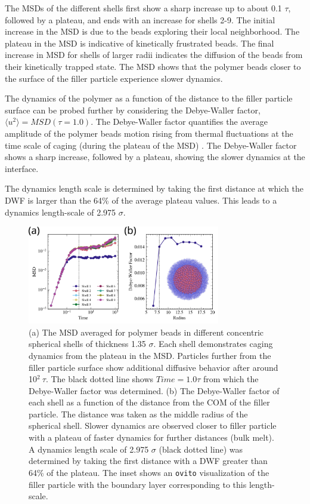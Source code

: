 \documentclass[10pt,a4paper]{labreport}
\begin{document}
The MSDs of the different shells first show a sharp increase up to about 0.1 $\tau$, followed by a plateau, and ends with an increase for shells 2-9.
The initial increase in the MSD is due to the beads exploring their local neighborhood.
The plateau in the MSD is indicative of kinetically frustrated beads.
The final increase in MSD for shells of larger radii indicates the diffusion of the beads from their kinetically trapped state.  
The MSD shows that the polymer beads closer to the surface of the filler particle experience slower dynamics.  

The dynamics of the polymer as a function of the distance to the filler particle surface can be probed further by considering the Debye-Waller factor, $\langle u^2 \rangle = MSD(\tau = 1.0)$. 
The Debye-Waller factor quantifies the average amplitude of the polymer beads motion rising from thermal fluctuations at the time scale of caging (during the plateau of the MSD) \cite{zhuEffectNanoparticleSoftness2022a}.  
The Debye-Waller factor shows a sharp increase, followed by a plateau, showing the slower dynamics at the interface.

The dynamics length scale is determined by taking the first distance at which the DWF is larger than the 64\% of the average plateau values. 
This leads to a dynamics length-scale of 2.975 $\sigma$.  

\begin{figure}[h]
  \centering
  \includegraphics[width = 0.75\textwidth]{figs/ass3_dynamics.png}
  \caption{(a) The MSD averaged for polymer beads in different concentric spherical shells of thickness 1.35 $\sigma$. Each shell demonstrates caging dynamics from the plateau in the MSD. Particles further from the filler particle surface show additional diffusive behavior after around 10$^2~\tau$. The black dotted line shows $Time = 1.0 \tau$ from which the Debye-Waller factor was determined. (b) The Debye-Waller factor of each shell as a function of the distance from the COM of the filler particle. The distance was taken as the middle radius of the spherical shell. Slower dynamics are observed closer to filler particle with a plateau of faster dynamics for further distances (bulk melt). A dynamics length scale of 2.975 $\sigma$ (black dotted line) was determined by taking the first distance with a DWF greater than 64\% of the plateau. The inset shows an \texttt{ovito} visualization of the filler particle with the boundary layer corresponding to this length-scale.  }
  \label{fig:ass3_dynamics}
\end{figure}

\printbibliography

%   
\end{document}
